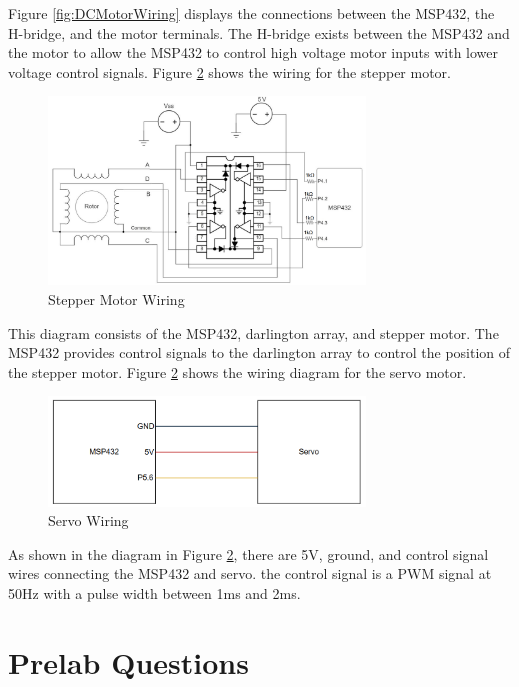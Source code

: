 \documentclass[CMPE]{KGCOEReport}
\begin{document}
Figure \ref{fig:DCMotorWiring} displays the connections between the MSP432, the H-bridge, and the motor terminals. The H-bridge exists between the MSP432 and the motor to allow the MSP432 to control high voltage motor inputs with lower voltage control signals. Figure \ref{fig:ServoWiring} shows the wiring for the stepper motor. 

\begin{figure}[H]
    \centering
    \includegraphics[width=0.75\textwidth]{StepperWiring.png}
    \caption{Stepper Motor Wiring}
    \label{fig:StepperWiring}
\end{figure}

This diagram consists of the MSP432, darlington array, and stepper motor. The MSP432 provides control signals to the darlington array to control the position of the stepper motor. Figure \ref{fig:ServoWiring} shows the wiring diagram for the servo motor.

\begin{figure}[H]
    \centering
    \includegraphics[width=0.75\textwidth]{ServoWiring.png}
    \caption{Servo Wiring}
    \label{fig:ServoWiring}
\end{figure}

As shown in the diagram in Figure \ref{fig:ServoWiring}, there are 5V, ground, and control signal wires connecting the MSP432 and servo. the control signal is a PWM signal at 50Hz with a pulse width between 1ms and 2ms.

\section*{Prelab Questions}
\end{document}
